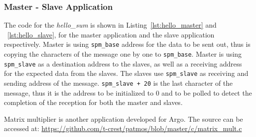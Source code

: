\documentclass[a4paper,fontsize=10pt,twoside,DIV15,BCOR12mm,headinclude=true,footinclude=false,pagesize,bibtotoc]{scrbook}
\newcommand{\code}[1]{{\texttt{#1}}}
\begin{document}
\subsubsection{Master - Slave Application}
The code for the \textit{hello\_sum} is shown in Listing~\ref{lst:hello_master} and ~\ref{lst:hello_slave}, 
for the master application and the slave application respectively.
Master is using \code{spm\_base} address for the data to be sent out, thus is copying the characters of the message one by one to \code{spm\_base}.
Master is using \code{spm\_slave} as a destination address to the slaves, as well as a receiving address for the expected data from the slaves. 
The slaves use \code{spm\_slave} as receiving and sending address of the message. \code{spm\_slave + 20} is the last character of the message, 
thus it is the address to be initialized to 0 and to be polled to detect the completion of the reception for both the master and slaves.

%
%
%



Matrix multiplier is another application developed for Argo. 
The source can be accessed at: 
\url{https://github.com/t-crest/patmos/blob/master/c/matrix_mult.c}



\end{document}
